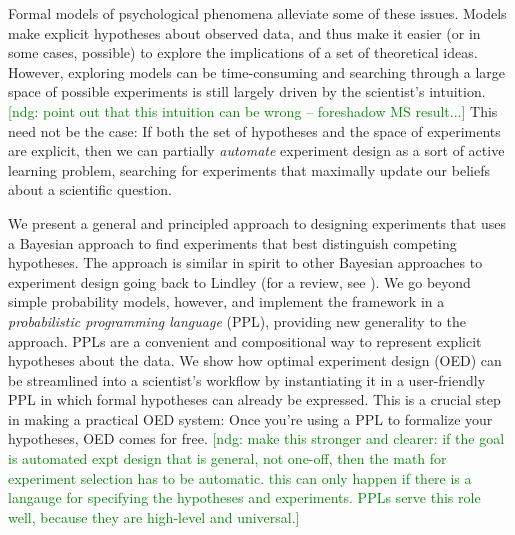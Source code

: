 \documentclass{article}
\newcommand{\ndg}[1]{\textcolor{Green}{[ndg: #1]}}
\newcommand{\lou}[1]{\textcolor{orange}{[lou: #1]}}
\begin{document}
Formal models of psychological phenomena alleviate some of these issues.
Models make explicit hypotheses about observed data, and thus make it easier (or in some cases, possible) to explore the implications of a set of theoretical ideas.
However, exploring models can be time-consuming and searching through a large space of possible experiments is still largely driven by the scientist's intuition.
\ndg{point out that this intuition can be wrong -- foreshadow MS result...}
This need not be the case: If both the set of hypotheses and the space of experiments are explicit, then we can partially \emph{automate} experiment design as a sort of active learning problem, searching for experiments that maximally update our beliefs about a scientific question.

We present a general and principled approach to designing experiments that uses a Bayesian approach to find experiments that best distinguish competing hypotheses.
The approach is similar in spirit to other Bayesian approaches to experiment design going back to Lindley \cite{Lindley1956} (for a review, see \cite{Chaloner1995}).
We go beyond simple probability models, however, and implement the framework  in a \emph{probabilistic programming language} (PPL), providing new generality to the approach.
PPLs are a convenient and compositional way to represent explicit hypotheses about the data.
We show how optimal experiment design (OED) can be streamlined into a scientist's workflow by instantiating it in a user-friendly PPL in which formal hypotheses can already be expressed.
This is a crucial step in making a practical OED system: Once you're using a PPL to formalize your hypotheses, OED comes for free.
\ndg{make this stronger and clearer: if the goal is automated expt design that is general, not one-off, then the math for experiment selection has to be automatic. this can only happen if there is a langauge for specifying the hypotheses and experiments. PPLs serve this role well, because they are high-level and universal.}

\end{document}
